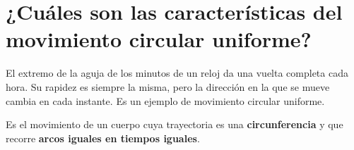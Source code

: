 %
%

\section[Características del movimiento circular uniforme]{¿Cuáles son las características del movimiento circular uniforme?}

El extremo de la aguja de los minutos de un reloj da una vuelta completa cada hora. Su rapidez es siempre la misma, pero la dirección en la que se mueve cambia en cada instante. Es un ejemplo de movimiento circular uniforme.

\begin{definition}
    Es el movimiento de un cuerpo cuya trayectoria es una \textbf{circunferencia} y que recorre \textbf{arcos iguales en tiempos iguales}.
\end{definition}

